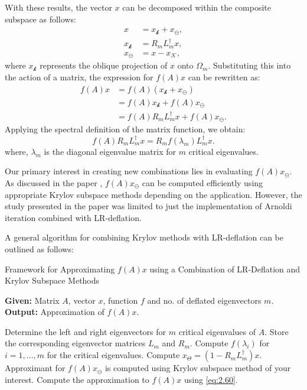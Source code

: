 With these results, the vector $x$ can be decomposed within the composite subspace as follows:
\[
\begin{aligned}
    x &= x_{\mathcal{k}} + x_{\ominus}, \\
    x_{\mathcal{k}} &= R_{m} L_{m}^{\dagger} x, \\
    x_{\ominus} &= x - x_{\mathcal{K}},
\end{aligned}
\]
where $x_{\mathcal{k}}$ represents the oblique projection of $x$ onto $\Omega_{m}$. Substituting this into the action of a matrix, the expression for $f(A)x$ can be rewritten as:
\[
\begin{aligned}
    f(A)x &= f(A)(x_{\mathcal{k}} + x_{\ominus}) \\
          &= f(A)x_{\mathcal{k}} + f(A)x_{\ominus} \\
          &= f(A)R_{m}L_{m}^{\dagger}x + f(A)x_{\ominus}.
\end{aligned}
\]
Applying the spectral definition of the matrix function, we obtain:
\[
    f(A)R_{m}L_{m}^{\dagger}x = R_{m}f(\lambda_{m})L_{m}^{\dagger}x.
\]
where, $\lambda_m$ is the diagonal eigenvalue matrix for $m$ critical eigenvalues.

Our primary interest in creating new combinations lies in evaluating $f(A)x_{\ominus}$. As discussed in the paper \cite{11}, $f(A)x_{\ominus}$ can be computed efficiently using appropriate Krylov subspace methods depending on the application. However, the study presented in the paper\cite{11} was limited to just the implementation of Arnoldi iteration combined with LR-deflation.

A general algorithm for combining Krylov methods with LR-deflation can be outlined as follows:

\begin{algorithm}[H]
    \caption{Framework for Approximating $f(A)x$ using a Combination of LR-Deflation and Krylov Subspace Methods}
    \label{alg:lr_combo}
    \textbf{Given:} Matrix $A$, vector $x$, function $f$ and no. of deflated eigenvectors $m$.\\
    \textbf{Output:} Approximation of $f(A)x$.
    \begin{algorithmic}[1]
        \STATE Determine the left and right eigenvectors for $m$ critical eigenvalues of $A$. Store the corresponding eigenvector matrices $L_m$ and $R_m$.
        \STATE Compute $f(\lambda_i)$ for $i = 1, \dots, m$ for the critical eigenvalues.
        \STATE Compute $x_{\Theta} = \left(1 - R_m L_m^{\dagger} \right) x$.
        \STATE Approximant for $f(A)x_{\ominus}$ is computed using Krylov subspace method of your interest.
        \STATE Compute the approximation to $f(A)x$ using \ref{eq:2.60}.
    \end{algorithmic}
\end{algorithm}


